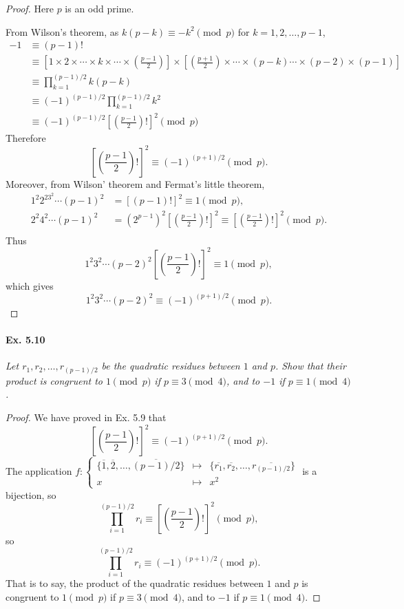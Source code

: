 \documentclass[11pt,a4paper]{article}
\begin{document}
\begin{proof}
Here $p$ is an odd prime.

From Wilson's theorem, as $k(p-k) \equiv -k^2 \pmod p$ for $k=1,2,\ldots,p-1$,
\begin{align*}
-1&\equiv (p-1)!\\
&\equiv \left[1\times 2\times\cdots\times k\times \cdots\times\left(\frac{p-1}{2}\right)\right]\times\left[\left(\frac{p+1}{2}\right)\times\cdots\times(p-k)\cdots\times(p-2)\times(p-1)\right]\\
&\equiv \prod_{k=1}^{(p-1)/2} k(p-k)\\
&\equiv (-1)^{(p-1)/2} \prod_{k=1}^{(p-1)/2} k^2 \\
&\equiv (-1)^{(p-1)/2}\left[\left(\frac{p-1}{2}\right)!\right]^2 \pmod p
\end{align*}
Therefore $$\left[\left(\frac{p-1}{2}\right)!\right]^2 \equiv (-1)^{(p+1)/2} \pmod p.$$
Moreover, from Wilson' theorem and Fermat's little theorem,
\begin{align*}
1^2 2^23^2\cdots(p-1)^2 &= [(p-1)!]^2 \equiv 1 \pmod p,\\
2^2 4^2 \cdots(p-1)^2 &=\left(2^{p-1}\right)^2 \left[\left(\frac{p-1}{2}\right)!\right]^2\equiv \left[\left(\frac{p-1}{2}\right)!\right]^2 \pmod p.\\
\end{align*}
Thus
$$1^2 3^2\cdots(p-2)^2 \left[\left(\frac{p-1}{2}\right)!\right]^2 \equiv 1 \pmod p,$$
which gives
$$1^2 3^2\cdots(p-2)^2 \equiv (-1)^{(p+1)/2} \pmod p.$$
\end{proof}

\paragraph{Ex. 5.10}

{\it Let $r_1, r_2, \ldots, r_{(p-1)/2}$ be the quadratic residues between
$1$ and $p$. Show that their product is congruent to $1 \pmod p$ if $p
\equiv 3 \pmod 4$, and to $-1$ if $p \equiv 1 \pmod 4$.

}

\begin{proof}
We have proved in Ex. 5.9 that
$$\left[\left(\frac{p-1}{2}\right)!\right]^2 \equiv (-1)^{(p+1)/2} \pmod p.$$
The application 
$ f:
\left\{
\begin{array}{ccc}
\{\overline{1},\overline{2},\ldots,\overline{(p-1)/2}\}  & \mapsto    & \{ \overline{r_1},\overline{ r_2}, \ldots, \overline{r_{(p-1)/2}}\} \\
  x &  \mapsto  &  x^2   
\end{array}
\right.
$ is a bijection, so
$$\prod_{i=1}^{(p-1)/2} r_i \equiv \left[\left(\frac{p-1}{2}\right)!\right]^2 \pmod p,$$
so
$$\prod_{i=1}^{(p-1)/2} r_i \equiv (-1)^{(p+1)/2} \pmod p.$$
That is to say, the product of the quadratic residues between $1$ and $p$ is congruent to $1 \pmod p$ if $p
\equiv 3 \pmod 4$, and to $-1$ if $p \equiv 1 \pmod 4$.
\end{proof}
\end{document}
